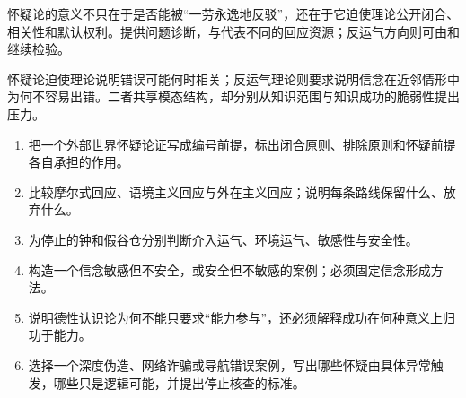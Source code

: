 怀疑论的意义不只在于是否能被“一劳永逸地反驳”，还在于它迫使理论公开闭合、相关性和默认权利。\textcite{stroud1984}提供问题诊断，\textcite{derose1995}与\textcite{wright2004}代表不同的回应资源；反运气方向则可由\textcite{comesana2005}和\textcite{pritchard2012}继续检验。

\begin{checkpoint}
怀疑论迫使理论说明错误可能何时相关；反运气理论则要求说明信念在近邻情形中为何不容易出错。二者共享模态结构，却分别从知识范围与知识成功的脆弱性提出压力。
\end{checkpoint}

\begin{exercises}
\begin{enumerate}
  \item 把一个外部世界怀疑论证写成编号前提，标出闭合原则、排除原则和怀疑前提各自承担的作用。
  \item 比较摩尔式回应、语境主义回应与外在主义回应；说明每条路线保留什么、放弃什么。
  \item 为停止的钟和假谷仓分别判断介入运气、环境运气、敏感性与安全性。
  \item 构造一个信念敏感但不安全，或安全但不敏感的案例；必须固定信念形成方法。
  \item 说明德性认识论为何不能只要求“能力参与”，还必须解释成功在何种意义上归功于能力。
  \item 选择一个深度伪造、网络诈骗或导航错误案例，写出哪些怀疑由具体异常触发，哪些只是逻辑可能，并提出停止核查的标准。
\end{enumerate}
\end{exercises}

\clearpage
\begin{readingmap}
\end{readingmap}
